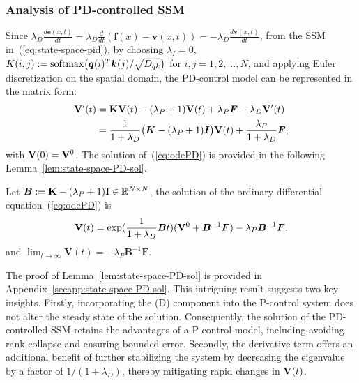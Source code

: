 \subsubsection{Analysis of PD-controlled SSM}
Since $\lambda_D \frac{d\bm{e}(x, t)}{dt} = \lambda_D \frac{d}{dt}(\bm{f}(x) - \bm{v}(x, t)) = -\lambda_D\frac{d\bm{v}(x, t)}{dt}$,
from the SSM in~(\ref{eq:state-space-pid}), by choosing $\lambda_I = 0$, $K(i,j):= {\rm softmax}\bigl({\bm q}(i)^{T}{\bm k}(j)/\sqrt{D_{qk}}\bigl)$ for $i,j = 1, 2, \dots, N$, and applying Euler discretization on the spatial domain, the PD-control model can be represented in the matrix form:
\begin{equation}
\label{eq:odePD}
    \begin{aligned}
    {\mathbf V}'(t) &= {\mathbf K}{\mathbf V}(t) - (\lambda_P + 1){\mathbf V}(t) + \lambda_P \bm{F} - \lambda_D{\mathbf V}'(t)\\
    &= \frac{1}{1 + \lambda_D}\bigl(\bm{K} - (\lambda_P + 1)\bm{I}\bigl){\mathbf V}(t) + \frac{\lambda_P}{1 + \lambda_D}\bm{F},
\end{aligned}
\end{equation}
with ${\mathbf V}(0) = {\mathbf V}^0$.
The solution of~(\ref{eq:odePD}) is provided in the following Lemma~\ref{lem:state-space-PD-sol}.
\begin{lemma}
    \label{lem:state-space-PD-sol}
    Let $\bm{B} := {\mathbf K} - (\lambda_P + 1){\mathbf I} \in \mathbb{R}^{N \times N}$, the solution of the ordinary differential equation~(\ref{eq:odePD}) is 
    \begin{align}
    \nonumber
    \label{eq:state-space-PD-sol}
    {\mathbf V}(t) = \mathrm{exp}(\frac{1}{1 + \lambda_D}\bm{B}t)({\mathbf V}^0 + \bm{B}^{-1}\bm{F}) - \lambda_P\bm{B}^{-1}\bm{F}.
    \end{align} 
and $\lim_{t \to \infty}\bm{V}(t) = -\lambda_P\bm{B}^{-1}\bm{F}$.
\end{lemma}
The proof of Lemma~\ref{lem:state-space-PD-sol} is provided in Appendix~\ref{secapp:state-space-PD-sol}. This intriguing result suggests two key insights. Firstly, incorporating the (D) component into the P-control system does not alter the steady state of the solution. Consequently, the solution of the PD-controlled SSM retains the advantages of a P-control model, including avoiding rank collapse and ensuring bounded error. Secondly, the derivative term offers an additional benefit of further stabilizing the system by decreasing the eigenvalue by a factor of $\displaystyle{1}/({1 + \lambda_D})$, thereby mitigating rapid changes in ${\mathbf V}(t)$.
